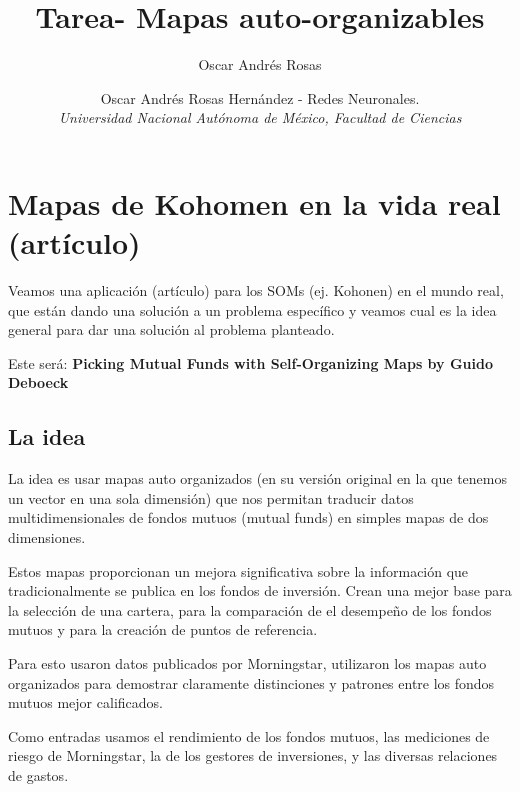 \documentclass[fleqn, journal, onecolumn]{IEEEtran}             %
\author{Oscar Andrés Rosas}                                     %
\newcommand \Quote              {\qq}                           %
\theoremstyle{break}                                            %
\begin{document}
    \title{Tarea- Mapas auto-organizables}
    \author{
        Oscar Andrés Rosas Hernández - Redes Neuronales. \\
        \textit{Universidad Nacional Autónoma de México, Facultad de Ciencias}
    }

    \maketitle

    \section{Mapas de Kohomen en la vida real (artículo)}
    
      Veamos una aplicación (artículo) para los SOMs (ej. Kohonen) en el mundo real, que
      están dando una solución a un problema específico y veamos cual es la idea general
      para dar una solución al problema planteado.
      
      Este será: \textbf{Picking Mutual Funds with Self-Organizing Maps by Guido Deboeck} \cite{Visual}
      
      \subsection{La idea}
      
      La idea es usar mapas auto organizados (en su versión original en la que tenemos un vector
      en una sola dimensión) que nos permitan traducir datos multidimensionales
      de fondos mutuos (mutual funds) en simples mapas de dos dimensiones.
      
      Estos mapas proporcionan un mejora significativa sobre la información que
      tradicionalmente se publica en los fondos de inversión.
      Crean una mejor base para la selección de una cartera, para la comparación de
      el desempeño de los fondos mutuos y para la creación de puntos de referencia.
      
      Para esto usaron datos publicados por Morningstar, utilizaron los mapas auto organizados
      para demostrar claramente distinciones y patrones entre los fondos mutuos mejor calificados.
      
      Como entradas usamos el rendimiento de los fondos mutuos, las mediciones de riesgo de Morningstar, la
      \Quote{tenencia} de los gestores de inversiones, y las diversas relaciones de gastos.
\end{document}
